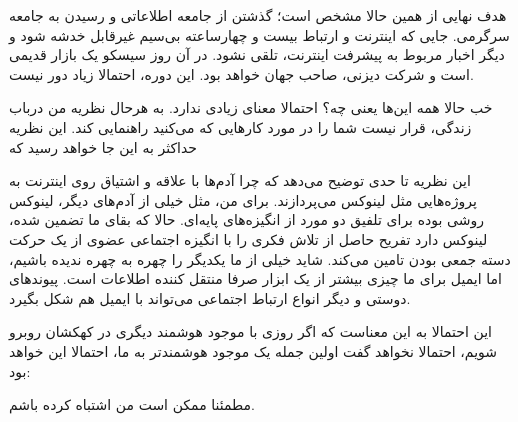هدف نهایی از همین حالا مشخص است؛ گذشتن از جامعه اطلاعاتی و رسیدن به
جامعه سرگرمی. جایی که اینترنت و ارتباط بیست و چهارساعته بی‌سیم غیرقابل
خدشه شود و دیگر اخبار مربوط به پیشرفت اینترنت،  تلقی
نشود. در آن روز سیسکو یک بازار قدیمی است و شرکت دیزنی، صاحب جهان خواهد
بود. این دوره، احتمالا زیاد دور نیست.

\vspace*{20pt}

خب حالا همه این‌ها یعنی چه؟ احتمالا معنای زیادی ندارد. به هرحال نظریه
من درباب زندگی، قرار نیست شما را در مورد کارهایی که می‌کنید راهنمایی
کند. این نظریه حداکثر به این جا خواهد رسید که 

این نظریه تا حدی توضیح می‌دهد که چرا آدم‌ها با علاقه و اشتیاق روی
اینترنت به پروژه‌هایی مثل لینوکس می‌پردازند. برای من، مثل خیلی از آدم‌های
دیگر، لینوکس روشی بوده برای تلفیق دو مورد از انگیزه‌های پایه‌ای. حالا که
بقای ما تضمین شده، لینوکس دارد تفریح حاصل از تلاش فکری را با انگیزه
اجتماعی عضوی از یک حرکت دسته جمعی بودن تامین می‌کند. شاید خیلی از ما
یکدیگر را چهره به چهره ندیده باشیم، اما ایمیل برای ما چیزی بیشتر از یک
ابزار صرفا منتقل کننده اطلاعات است. پیوندهای دوستی و دیگر انواع ارتباط
اجتماعی می‌تواند با ایمیل هم شکل بگیرد.

این احتمالا به این معناست که اگر روزی با موجود هوشمند دیگری در کهکشان
روبرو شویم، احتمالا نخواهد گفت  اولین جمله یک موجود هوشمندتر به ما، احتمالا این خواهد بود:

مطمئنا ممکن است من اشتباه کرده باشم.
